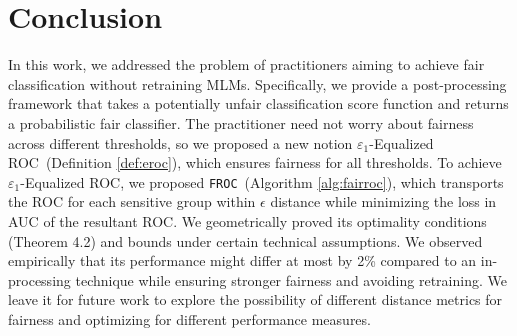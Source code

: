 \documentclass{article}
\newcommand{\ouralgo}{\texttt{FROC}}
\newcommand{\ourdef}{-Equalized ROC}
\begin{document}
    
    
    







\section{Conclusion}
In this work, we addressed the problem of practitioners aiming to achieve fair classification without retraining MLMs. Specifically, we provide a post-processing framework that takes a potentially unfair classification score function and returns a probabilistic fair classifier. 
The practitioner need not worry about fairness across different thresholds, so we proposed a new notion $\varepsilon_1$\ourdef\ (Definition \ref{def:eroc}), which ensures fairness for all thresholds. To achieve $\varepsilon_1$\ourdef, we proposed \ouralgo\ (Algorithm \ref{alg:fairroc}), which transports the ROC for each sensitive group within $\epsilon$ distance while minimizing the loss in AUC of the resultant ROC. 
We geometrically proved its optimality conditions (Theorem 4.2) and bounds under certain technical assumptions. We observed empirically that its performance might differ at most by 2\% compared to an in-processing technique while ensuring stronger fairness and avoiding retraining. We leave it for future work to explore the possibility of different distance metrics for fairness and optimizing for different performance measures. 
\end{document}
